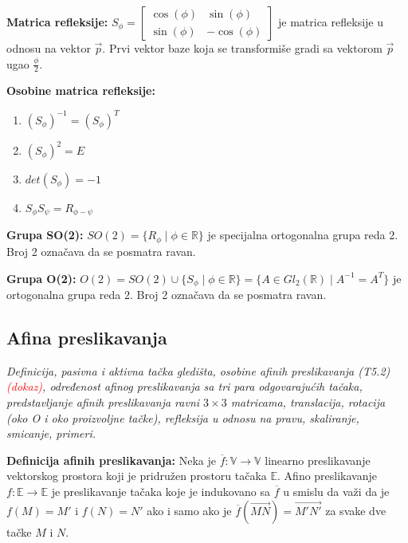\documentclass[12pt]{article}
\newcommand{\vek}[1]{\overrightarrow{#1}}
\newcommand{\ocena}[1]{\textcolor{red}{#1}}
\begin{document}
\textbf{Matrica refleksije:} $S_\phi=\begin{bmatrix}
        \cos(\phi) & \sin(\phi)  \\
        \sin(\phi) & -\cos(\phi)
    \end{bmatrix}$ je matrica refleksije u odnosu na vektor $\vek{p}$.
Prvi vektor baze koja se transformiše gradi sa vektorom $\vek{p}$ ugao
$\frac{\phi}{2}$.
\par

\textbf{Osobine matrica refleksije:}
\begin{enumerate}[label=\textbf{(\arabic*)}]
    \item $(S_\phi)^{-1}=(S_\phi)^T$
    \item $(S_\phi)^{2}=E$
    \item $det(S_\phi)=-1$
    \item $S_\phi S_\psi=R_{\phi-\psi}$
\end{enumerate}
\par

\textbf{Grupa SO(2):} $SO(2)=\{R_\phi\mid\phi\in\mathbb{R}\}$ je specijalna
ortogonalna grupa reda 2. Broj 2 označava da se posmatra ravan.
\par

\textbf{Grupa O(2):}
$O(2)=SO(2)\cup\{S_\phi\mid\phi\in\mathbb{R}\}=\{A\in
    Gl_2(\mathbb{R})\mid A^{-1}=A^T\}$
je ortogonalna grupa reda 2. Broj 2 označava da se posmatra ravan.

\subsection{Afina preslikavanja}
\textit{Definicija, pasivna i aktivna tačka gledišta, osobine afinih
    preslikavanja (T5.2) \ocena{(dokaz)}, određenost afinog preslikavanja sa tri para
    odgovarajućih tačaka, predstavljanje afinih preslikavanja ravni $3\times3$
    matricama, translacija, rotacija (oko O i oko proizvoljne tačke),
    refleksija u odnosu na pravu, skaliranje, smicanje, primeri.}
\par
\vspace*{1cm}

\textbf{Definicija afinih preslikavanja:} Neka je
$\overline{f}: \mathbb{V}\rightarrow\mathbb{V}$ linearno preslikavanje
vektorskog prostora koji je pridružen prostoru tačaka $\mathbb{E}$. Afino
preslikavanje $f: \mathbb{E}\rightarrow\mathbb{E}$ je preslikavanje tačaka koje
je indukovano sa $\overline{f}$ u smislu da važi da je $f(M)=M'$ i $f(N)=N'$
ako i samo ako je $\overline{f}(\vek{MN})=\vek{M'N'}$ za svake dve tačke $M$ i
$N$.
\par
\end{document}
